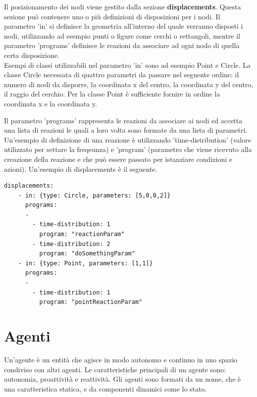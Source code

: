\documentclass[12pt,a4paper,openright,twoside]{report}
\begin{document}
Il posizionamento dei nodi viene gestito dalla sezione \textbf{displacements}. Questa sezione pu\`o contenere uno o pi\`u definizioni di disposizioni per i nodi.
Il parametro 'in' si definisce la geometria all'interno del quale verranno disposti i nodi, utilizzando ad esempio punti o figure come cerchi o rettangoli, mentre il parametro 'programs' definisce le reazioni da associare ad ogni nodo di quella certa disposizione.
\\
Esempi di classi utilizzabili nel parametro 'in' sono ad esempio Point e Circle.
La classe Circle necessata di quattro parametri da passare nel seguente ordine: il numero di nodi da disporre, la coordinata x del centro, la coordinata y del centro, il raggio del cerchio. Per la classe Point \`e sufficiente fornire in ordine la coordinata x e la coordinata y.

Il parametro 'programs' rappresenta le reazioni da associare ai nodi ed accetta una lista di reazioni le quali a loro volta sono formate da una lista di parametri. Un'esempio di definizione di una reazione \`e utilizzando 'time-distribution' (valore utilizzato per settare la freqeunza) e 'program' (parametro che viene ricevuto alla creazione della reazione e che pu\`o essere passato per istanziare condizioni e azioni).
Un'esempio di displacements \`e il seguente.
\medskip
\begin{lstlisting}[firstnumber=last,caption={Disposizione nodi e reazioni associate}]
  displacements:
    - in: {type: Circle, parameters: [5,0,0,2]}
      programs:
      -
        - time-distribution: 1
          program: "reactionParam"
        - time-distribution: 2
          program: "doSomethingParam"
    - in: {type: Point, parameters: [1,1]}
      programs:
      -
        - time-distribution: 1
          program: "pointReactionParam"
\end{lstlisting}


\chapter{Agenti}
\lhead[\fancyplain{}{\bfseries\thepage}]{\fancyplain{}{\bfseries\rightmark}}

Un'agente \`e un entit\`a che agisce in modo autonomo e continuo in uno spazio condiviso con altri agenti. Le caratteristiche principali di un agente sono: autonomia, proattivit\`a e reattivit\`a. Gli agenti sono formati da un nome, che \`e una caratteristica statica, e da componenti dinamici come lo stato.
\end{document}
